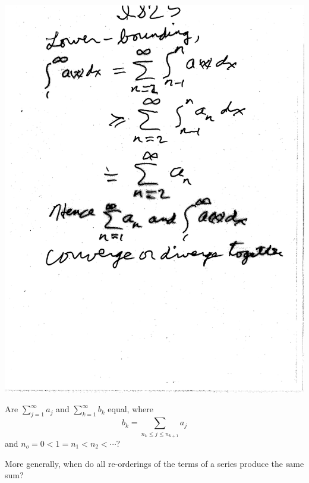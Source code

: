 \documentclass[10pt,a4paper]{article}
\begin{document}
\includegraphics[scale=.5]{Pages/IS_25}

\newpage

\noindent Are $\sum_{j=1}^{\infty} a_j$ and $ \sum_{k=1}^{\infty} b_k$ equal, where 
\\$$b_k = \sum_{n_k \leq j \leq n_{k+1}} a_j$$
and $n_o = 0 < 1 = n_1 < n_2 < \cdots $? 
\\ \vspace{2mm}

\noindent More generally, when do all re-orderings of the terms of a series produce the same sum?
\end{document}
